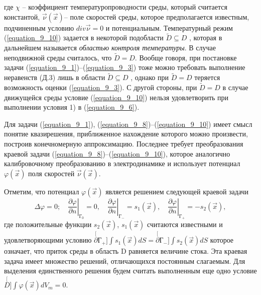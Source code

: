 где  $\chi$ -- коэффициент температуропроводности среды, который считается константой, $\vec\nu(\vec x)$-- поле скоростей среды, которое предполагается известным, подчиненным условию $div \vec\nu{=}0$ и потенциальным. Температурный режим (\ref{equation_9_10}) задается в некоторой подобласти $\tilde{D}{\subseteq}D$ , которая в дальнейшем называется \textit{ областью контроля температуры}. В случае неподвижной среды считалось, что $\tilde{D}{=}D$. Вообще говоря, при постановке задачи (\ref{equation_9_1})--(\ref{equation_9_3}) тоже можно требовать выполнение неравенств (Д.3) лишь в области $\tilde{D}{\subseteq}D$  , однако при $\tilde{D}{=}D$  теряется возможность оценки (\ref{equation_9_3}). С другой стороны, при $\tilde{D}{=}D$  в случае движущейся среды условие (\ref{equation_9_10}) нельзя удовлетворить при выполнении условия 1) в (\ref{equation_9_6}).

Для задачи (\ref{equation_9_1}), (\ref{equation_9_8})--(\ref{equation_9_10}) имеет смысл понятие квазирешения, приближенное нахождение которого можно произвести, построив конечномерную аппроксимацию. Последнее требует преобразования краевой задачи (\ref{equation_9_8})--(\ref{equation_9_10}), которое аналогично калибровочному преобразованию в электродинамике и использует потенциал $\varphi(\vec x)$ поля скоростей $\vec\nu(\vec x)$.

Отметим, что потенциал $\varphi(\vec x)$ является решением следующей краевой задачи \[\Delta\varphi=0;\quad \left.\frac{\partial \varphi}{\partial n}\right|_{\text{Г}_0}=0,\quad \left.\frac{\partial \varphi}{\partial n}\right|_{\text{Г}_-}=s_1(\vec x),\quad \left.\frac{\partial \varphi}{\partial n}\right|_{\text{Г}_+}=-s_2(\vec x),\]где положительные функции $s_2(\vec x)$, $s_1(\vec x)$  считаются известными и удовлетворяющими условию ${\stackrel[\partial Г_+]{}{\int}}s_1(\vec x)dS{=}{\stackrel[\partial Г_-]{}{\int}}s_2(\vec x)dS$ которое означает, что приток среды в область D равняется величине стока. Эта краевая задача имеет множество решений, отличающихся постоянным слагаемым. Для выделения единственного решения будем считать выполненным еще одно условие ${\stackrel[D]{}{\int}}\varphi(\vec x)dV_m=0$.


